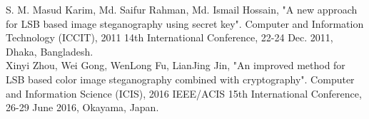 \documentclass[conference]{IEEEtran}
\begin{document}
\begin{thebibliography}{00}
 S. M. Masud Karim, Md. Saifur Rahman, Md. Ismail Hossain, "A new approach for LSB based image steganography using secret key".  Computer and Information Technology (ICCIT), 2011 14th International Conference, 22-24 Dec. 2011, Dhaka, Bangladesh.\\
 Xinyi Zhou, Wei Gong, WenLong Fu, LianJing Jin, "An improved method for LSB based color image steganography combined with cryptography". Computer and Information Science (ICIS), 2016 IEEE/ACIS 15th International Conference, 26-29 June 2016, Okayama, Japan.\\
\end{thebibliography}
\end{document}

